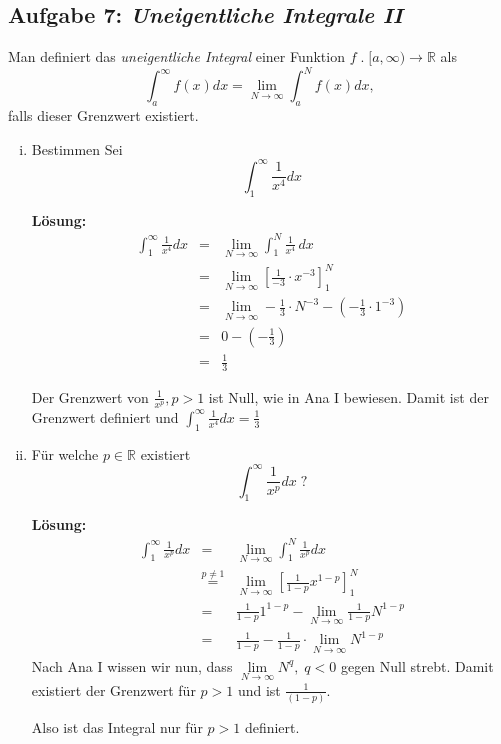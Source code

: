 \documentclass[11pt,a4paper,ngerman]{article}
\begin{document}

\subsection*{Aufgabe 7: \mdseries\itshape Uneigentliche Integrale II}

Man definiert das \emph{uneigentliche Integral} einer Funktion $f \; . \; [a,\infty) \rightarrow \mathbb{R}$ als
$$
\int_a^\infty f(x)dx = \lim_{N\rightarrow \infty} \int_a^N f(x)dx,
$$
falls dieser Grenzwert existiert.
\begin{enumerate}[(i)]
	\item Bestimmen Sei
		$$
			\int_1^\infty \frac{1}{x^4} dx
		$$
	
	\textbf{Lösung:}\\
	
	$$\begin{array}{rcl}
		\int_1^\infty \frac{1}{x^4} dx &=& \underset{{N\rightarrow \infty}}{\lim} \int_1^N \frac{1}{x^4} \, dx\\
			&=& \underset{{N\rightarrow \infty}}{\lim} \left[ \frac{1}{-3} \cdot x^{-3} \right]_1^N\\
			&=& \underset{{N\rightarrow \infty}}{\lim} - \frac{1}{3} \cdot N^{-3} - (-\frac{1}{3} \cdot 1^{-3})\\
			&=& 0 - (-\frac{1}{3})  \\
            &=& \frac{1}{3}
	\end{array}$$

	Der Grenzwert von $\frac{1}{x^p}, p>1$ ist Null, wie in Ana I bewiesen. Damit ist der Grenzwert definiert und $\int_1^\infty \frac{1}{x^4} dx = \frac{1}{3}$

	\item Für welche $p\in\mathbb{R}$ existiert
		$$
			\int_1^\infty \frac{1}{x^p}dx \; ?
		$$

	\textbf{Lösung:}\\
		$$\begin{array}{rcl}
			\int_1^\infty \frac{1}{x^p}dx &=& \underset{{N\rightarrow \infty}}{\lim} \int_1^N \frac{1}{x^p}dx\\
				&\stackrel{p\not=1}{=}& \underset{{N\rightarrow \infty}}{\lim} \left[ \frac{1}{1-p} x^{1-p}\right]_1^N\\
				&=& \frac{1}{1-p} 1^{1-p} -\underset{{N\rightarrow \infty}}{\lim} \frac{1}{1-p} N^{1-p}\\
                &=& \frac{1}{1-p} - \frac{1}{1-p} \cdot \underset{{N\rightarrow \infty}}{\lim} N^{1-p}
		\end{array}$$
		Nach Ana I wissen wir nun, dass $\underset{{N\rightarrow \infty}}{\lim} N^q, \; q < 0$ gegen Null strebt. Damit existiert der Grenzwert für $p > 1$ und ist $\frac{1}{(1-p)}$. 

		Also ist das Integral nur für $p > 1$ definiert.
\end{enumerate}
\end{document}
